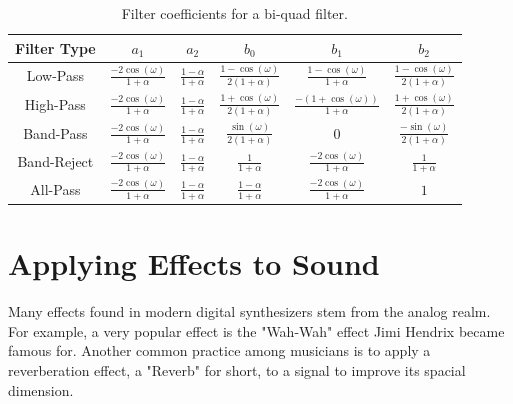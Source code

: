 \documentclass[12pt,twoside]{report}
\begin{document}
\begin{table}[h!]

  \centering

  \renewcommand{\arraystretch}{3}
  \begin{tabular}[]{ | c | c | c | c | c | c |}
    \hline
    \rowcolor[gray]{0.8}
    Filter Type & $a_{1}$ & $a_{2}$ & $b_{0}$ & $b_{1}$ & $b_{2}$ \\\hline
    Low-Pass & $\frac{-2\cos(\omega)}{1 + \alpha}$ & $\frac{1 - \alpha}{1 + \alpha}$ & $\frac{1-\cos(\omega)}{2(1 + \alpha)}$ & $\frac{1-\cos(\omega)}{1 + \alpha}$ & $\frac{1-\cos(\omega)}{2(1 + \alpha)}$\\\hline
    High-Pass & $\frac{-2\cos(\omega)}{1 + \alpha}$ & $\frac{1 - \alpha}{1 + \alpha}$ & $\frac{1+\cos(\omega)}{2(1 + \alpha)}$ & $\frac{-(1+\cos(\omega))}{1 + \alpha}$ & $\frac{1+\cos(\omega)}{2(1 + \alpha)}$\\\hline
    Band-Pass & $\frac{-2\cos(\omega)}{1 + \alpha}$ & $\frac{1 - \alpha}{1 + \alpha}$ & $\frac{\sin(\omega)}{2(1 + \alpha)}$ & $0$ & $\frac{-\sin(\omega)}{2(1 + \alpha)}$\\\hline
    Band-Reject & $\frac{-2\cos(\omega)}{1 + \alpha}$ & $\frac{1 - \alpha}{1 + \alpha}$ & $\frac{1}{1 + \alpha}$ & $\frac{-2\cos(\omega)}{1 + \alpha}$ & $\frac{1}{1 + \alpha}$\\\hline
    All-Pass & $\frac{-2\cos(\omega)}{1 + \alpha}$ & $\frac{1 - \alpha}{1 + \alpha}$ & $\frac{1 - \alpha}{1 + \alpha}$ & $\frac{-2\cos(\omega)}{1 + \alpha}$ & $1$\\
    \hline
  \end{tabular}

  \caption{Filter coefficients for a bi-quad filter.}

  \label{tb:coef}

\end{table}

\chapter{Applying Effects to Sound}

Many effects found in modern digital synthesizers stem from the analog realm. For example, a very popular effect is the "Wah-Wah" effect Jimi Hendrix became famous for. Another common practice among musicians is to apply a reverberation effect, a "Reverb" for short, to a signal to improve its spacial dimension.
\end{document}
